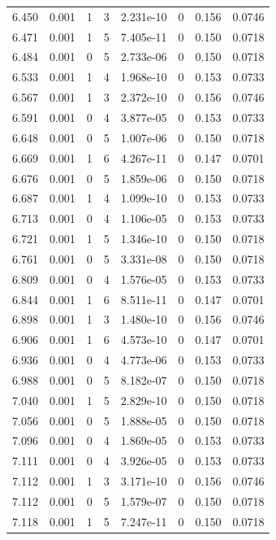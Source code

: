 \documentclass[preview]{standalone}
\begin{document}
{{{{{{\begin{tabular}{L{1.2cm}C{1.2cm} C{0.3cm}C{0.5cm} C{1.4cm}C{1.4cm} C{1.4cm}C{1.4cm}}
  6.450  &  0.001  & 1     &  3 &  2.231e-10  & 0  & 0.156 &  0.0746   \\ 
  6.471  &  0.001  & 1     &  5 &  7.405e-11  & 0  & 0.150 &  0.0718   \\ 
  6.484  &  0.001  & 0     &  5 &  2.733e-06  & 0  & 0.150 &  0.0718   \\ 
  6.533  &  0.001  & 1     &  4 &  1.968e-10  & 0  & 0.153 &  0.0733   \\ 
  6.567  &  0.001  & 1     &  3 &  2.372e-10  & 0  & 0.156 &  0.0746   \\ 
  6.591  &  0.001  & 0     &  4 &  3.877e-05  & 0  & 0.153 &  0.0733   \\ 
  6.648  &  0.001  & 0     &  5 &  1.007e-06  & 0  & 0.150 &  0.0718   \\ 
  6.669  &  0.001  & 1     &  6 &  4.267e-11  & 0  & 0.147 &  0.0701   \\ 
  6.676  &  0.001  & 0     &  5 &  1.859e-06  & 0  & 0.150 &  0.0718   \\ 
  6.687  &  0.001  & 1     &  4 &  1.099e-10  & 0  & 0.153 &  0.0733   \\ 
  6.713  &  0.001  & 0     &  4 &  1.106e-05  & 0  & 0.153 &  0.0733   \\ 
  6.721  &  0.001  & 1     &  5 &  1.346e-10  & 0  & 0.150 &  0.0718   \\ 
  6.761  &  0.001  & 0     &  5 &  3.331e-08  & 0  & 0.150 &  0.0718   \\ 
  6.809  &  0.001  & 0     &  4 &  1.576e-05  & 0  & 0.153 &  0.0733   \\ 
  6.844  &  0.001  & 1     &  6 &  8.511e-11  & 0  & 0.147 &  0.0701   \\ 
  6.898  &  0.001  & 1     &  3 &  1.480e-10  & 0  & 0.156 &  0.0746   \\ 
  6.906  &  0.001  & 1     &  6 &  4.573e-10  & 0  & 0.147 &  0.0701   \\ 
  6.936  &  0.001  & 0     &  4 &  4.773e-06  & 0  & 0.153 &  0.0733   \\ 
  6.988  &  0.001  & 0     &  5 &  8.182e-07  & 0  & 0.150 &  0.0718   \\ 
  7.040  &  0.001  & 1     &  5 &  2.829e-10  & 0  & 0.150 &  0.0718   \\ 
  7.056  &  0.001  & 0     &  5 &  1.888e-05  & 0  & 0.150 &  0.0718   \\ 
  7.096  &  0.001  & 0     &  4 &  1.869e-05  & 0  & 0.153 &  0.0733   \\ 
  7.111  &  0.001  & 0     &  4 &  3.926e-05  & 0  & 0.153 &  0.0733   \\ 
  7.112  &  0.001  & 1     &  3 &  3.171e-10  & 0  & 0.156 &  0.0746   \\ 
  7.112  &  0.001  & 0     &  5 &  1.579e-07  & 0  & 0.150 &  0.0718   \\ 
  7.118  &  0.001  & 1     &  5 &  7.247e-11  & 0  & 0.150 &  0.0718   \\ 
\hline 
\end{tabular} 

}}}}}}
\end{document}
